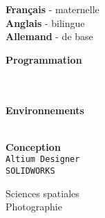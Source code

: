 \documentclass[9pt]{developercv} %
\begin{document}
\begin{minipage}[t]{0.18\textwidth}
		\textbf{Français} - maternelle\\
		\textbf{Anglais} - bilingue\\
		\textbf{Allemand} - de base

		\textbf{Programmation}
		\begin{barchart}{1.75}
		\end{barchart}
		\\\\
		\textbf{Environnements}
		\begin{barchart}{1.75}
		\end{barchart}
		\\
		\textbf{Conception}\\
		\texttt{Altium Designer}\\
		\texttt{SOLIDWORKS}

		Sciences spatiales\\
		Photographie

\end{minipage}

\end{document}
